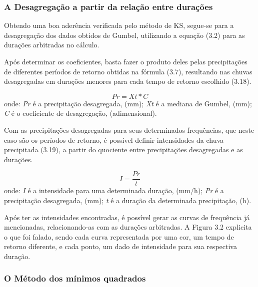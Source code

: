 \subsubsection{A Desagregação a partir da relação entre durações}\bigskip

Obtendo uma boa aderência verificada pelo método de KS, segue-se para a desagregação dos dados obtidos de Gumbel, utilizando a equação (3.2) para as durações arbitradas no cálculo.

Após determinar os coeficientes, basta fazer o produto deles pelas precipitações de diferentes períodos de retorno obtidas na fórmula (3.7), resultando nas chuvas desagregadas em durações menores para cada tempo de retorno escolhido (3.18).\bigskip

\begin{equation}
Pr = Xt * C
\end{equation}
\newline
onde:
\newline
\textit{Pr} é a precipitação desagregada, (mm);
\newline
\textit{Xt} é a mediana de Gumbel, (mm);
\newline
\textit{C} é o coeficiente de desagregação, (adimensional).\bigskip

Com as precipitações desagregadas para seus determinados frequências, que neste caso são os períodos de retorno, é possível definir intensidades da chuva precipitada (3.19), a partir do quociente entre precipitações desagregadas e as durações.\bigskip

\begin{equation}
I = \frac{Pr}{t}
\end{equation}
\newline
onde:
\newline
\textit{I} é a intensidade para uma determinada duração, (mm/h);
\newline
\textit{Pr} é a precipitação desagregada, (mm);
\newline
\textit{t} é a duração da determinada precipitação, (h).\bigskip

Após ter as intensidades encontradas, é possível gerar as curvas de frequência já mencionadas, relacionando-as com as durações arbitradas. A Figura 3.2 explicita o que foi falado, sendo cada curva representada por uma cor, um tempo de retorno diferente, e cada ponto, um dado de intensidade para sua respectiva duração.

\subsubsection{O Método dos mínimos quadrados}\bigskip

